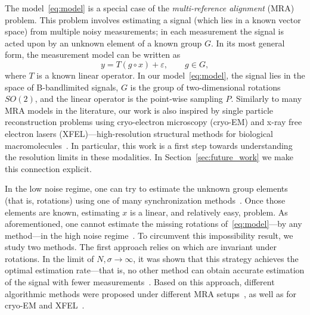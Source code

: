\documentclass[english,12pt]{article}
\numberwithin{equation}{section}
\numberwithin{thm}{section} %
\begin{document}
The model~\eqref{eq:model} is a special case of the \emph{multi-reference alignment} (MRA) problem. This problem involves estimating a signal (which lies in a known vector space) from multiple noisy measurements; in each measurement the signal is acted upon by an unknown element of a known group $G$. 
In its most general form, the measurement model can be written as 
\begin{equation} \label{eq:mra}
y = T(g\circ x) +\varepsilon, \qquad g\in G,
\end{equation}
where $T$ is a known linear operator. 
In our model~\eqref{eq:model}, the signal lies in the space of B-bandlimited signals, $G$ is the group of two-dimensional rotations $SO(2)$, and the linear operator is the point-wise sampling $P$.
Similarly to many MRA models in the literature,  our work is also inspired by single particle reconstruction problems using cryo-electron microscopy (cryo-EM) and x-ray free electron lasers (XFEL)---high-resolution structural methods for biological macromolecules~\cite{frank2006three,kuhlbrandt2014resolution,singer2018mathematics}. 
In particular, this work is a first step towards understanding the resolution limits in these modalities. In Section~\ref{sec:future_work} we make this connection explicit.

In the low noise regime, one can try to estimate the unknown group elements (that is, rotations) using one of many synchronization methods~\cite{singer2011angular,bandeira2015non,boumal2016nonconvex,chen2018projected,singer2011three}.
Once those elements are known, estimating $x$ is a linear, and relatively easy, problem. 
As aforementioned, one cannot estimate the missing rotations of~\eqref{eq:model}---by any method---in the high noise regime~\cite{bendory2018toward,aguerrebere2016fundamental}.
To circumvent this impossibility result, we study two methods.
The first approach relies on which are invariant 
under rotations. In the limit of $N,\sigma\to\infty$, it was shown that this strategy achieves the optimal  estimation rate---that is, no other method can obtain accurate estimation of the signal with fewer measurements~\cite{bandeira2017optimal,bandeira2017estimation,abbe2018multireference,abbe2018estimation}. Based on this approach, different algorithmic methods were proposed under different MRA setups~\cite{bendory2017bispectrum,perry2017sample,abbe2018multireference,boumal2018heterogeneous,chen2018spectral,ma2018heterogeneous,bandeira2014multireference}, as well as for  cryo-EM and XFEL~\cite{kam1980reconstruction,liu2013three,kurta2017correlations,levin20173d,bendory2018toward,pande2018ab,von2018structure}. 
\end{document}
